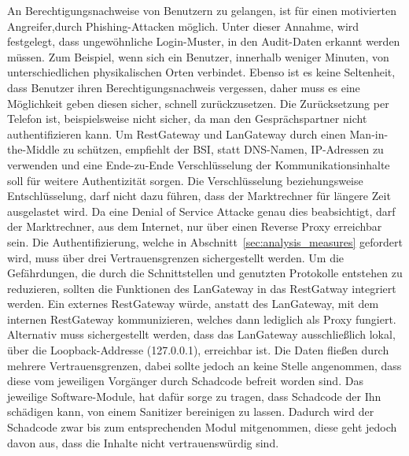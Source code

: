 \documentclass[11pt,a4paper]{report}
\begin{document}
An Berechtigungsnachweise von Benutzern zu gelangen, ist für einen motivierten Angreifer,durch Phishing-Attacken möglich. Unter dieser Annahme, wird festgelegt, dass ungewöhnliche Login-Muster, in den Audit-Daten erkannt werden müssen. Zum Beispiel, wenn sich ein Benutzer, innerhalb weniger Minuten, von unterschiedlichen physikalischen Orten verbindet. Ebenso ist es keine Seltenheit, dass Benutzer ihren Berechtigungsnachweis vergessen, daher muss es eine Möglichkeit geben diesen sicher, schnell zurückzusetzen. Die Zurücksetzung per Telefon ist, beispielsweise nicht sicher, da man den Gesprächspartner nicht authentifizieren kann. Um RestGateway und LanGateway durch einen Man-in-the-Middle zu schützen, empfiehlt der BSI, statt DNS-Namen, IP-Adressen zu verwenden \cite{bsi_m559} und eine Ende-zu-Ende Verschlüsselung der Kommunikationsinhalte soll für weitere Authentizität sorgen. Die Verschlüsselung beziehungsweise Entschlüsselung, darf nicht dazu führen, dass der Marktrechner für längere Zeit ausgelastet wird. Da eine Denial of Service Attacke genau dies beabsichtigt, darf der Marktrechner, aus dem Internet, nur über einen Reverse Proxy erreichbar sein. Die Authentifizierung, welche in Abschnitt~\ref{sec:analysis_measures} gefordert wird, muss über drei Vertrauensgrenzen sichergestellt werden. Um die Gefährdungen, die durch die Schnittstellen und genutzten Protokolle entstehen zu reduzieren, sollten die Funktionen des LanGateway in das RestGatway integriert werden. Ein externes RestGateway würde, anstatt des LanGateway, mit dem internen RestGateway kommunizieren, welches dann lediglich als Proxy fungiert. Alternativ muss sichergestellt werden, dass das LanGateway ausschließlich lokal, über die Loopback-Addresse (127.0.0.1), erreichbar ist. Die Daten fließen durch mehrere Vertrauensgrenzen, dabei sollte jedoch an keine Stelle angenommen, dass diese vom jeweiligen Vorgänger durch Schadcode befreit worden sind. Das jeweilige Software-Module, hat dafür sorge zu tragen, dass Schadcode der Ihn schädigen kann, von einem Sanitizer bereinigen zu lassen. Dadurch wird der Schadcode zwar bis zum entsprechenden Modul mitgenommen, diese geht jedoch davon aus, dass die Inhalte nicht vertrauenswürdig sind.

\end{document}
